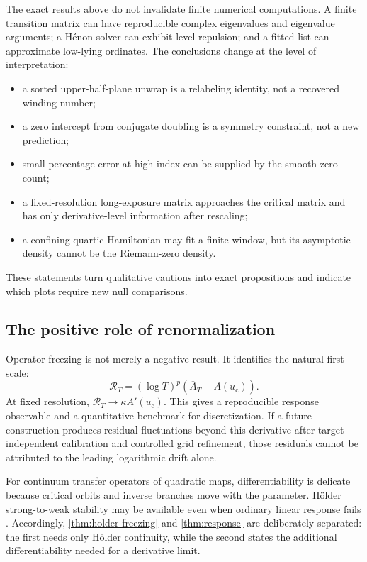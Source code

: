 \documentclass[11pt]{article}
\theoremstyle{definition}
\theoremstyle{remark}
\newcommand{\uc}{u_{\mathrm c}}
\begin{document}
The exact results above do not invalidate finite numerical computations.  A finite transition matrix can have reproducible complex eigenvalues and eigenvalue arguments; a H\'{e}non solver can exhibit level repulsion; and a fitted list can approximate low-lying ordinates.  The conclusions change at the level of interpretation:
\begin{itemize}[leftmargin=2em]
    \item a sorted upper-half-plane unwrap is a relabeling identity, not a recovered winding number;
    \item a zero intercept from conjugate doubling is a symmetry constraint, not a new prediction;
    \item small percentage error at high index can be supplied by the smooth zero count;
    \item a fixed-resolution long-exposure matrix approaches the critical matrix and has only derivative-level information after rescaling;
    \item a confining quartic Hamiltonian may fit a finite window, but its asymptotic density cannot be the Riemann-zero density.
\end{itemize}
These statements turn qualitative cautions into exact propositions and indicate which plots require new null comparisons.

\subsection{The positive role of renormalization}

Operator freezing is not merely a negative result.  It identifies the natural first scale:
\[
    \mathcal R_T=(\log T)^p(\overline A_T-A(\uc)).
\]
At fixed resolution, $\mathcal R_T\to\kappa A'(\uc)$.  This gives a reproducible response observable and a quantitative benchmark for discretization.  If a future construction produces residual fluctuations beyond this derivative after target-independent calibration and controlled grid refinement, those residuals cannot be attributed to the leading logarithmic drift alone.

For continuum transfer operators of quadratic maps, differentiability is delicate because critical orbits and inverse branches move with the parameter.  H\"older strong-to-weak stability may be available even when ordinary linear response fails \citep{KellerLiverani1999,Baladi2014}.  Accordingly, \cref{thm:holder-freezing} and \cref{thm:response} are deliberately separated: the first needs only H\"older continuity, while the second states the additional differentiability needed for a derivative limit.
\end{document}
